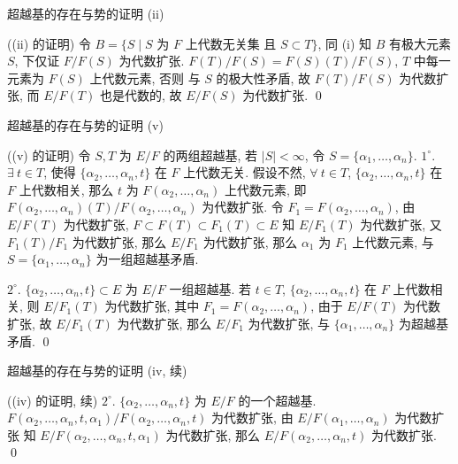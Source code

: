 
\begin{frame}{超越基的存在与势的证明 (ii)}

\startproof[bg=yellow, fg=red]((ii) 的证明)
令 $B = \{ S \mid S \text{ 为 } F \text{ 上代数无关集 且 } S \subset T \}$,
同 (i) 知 $B$ 有极大元素 $S$, 下仅证 $F/F(S)$ 为代数扩张.
$F(T)/F(S) = F(S)(T)/F(S)$, $T$ 中每一元素为 $F(S)$ 上代数元素, 否则
与 $S$ 的极大性矛盾, 故 $F(T)/F(S)$ 为代数扩张, 而 $E/F(T)$ 也是代数的,
故 $E/F(S)$ 为代数扩张.
\qed

\end{frame}


\begin{frame}{超越基的存在与势的证明 (v)}

\startproof[bg=yellow, fg=red]((v) 的证明)
令 $S, T$ 为 $E/F$ 的两组超越基,
若 $|S| < \infty$, 令 $S = \{ \alpha_1, \dots, \alpha_n \}$.
$1^{\circ}$. $\exists\ t \in T$, 使得 $\{ \alpha_2, \dots, \alpha_n, t \}$
在 $F$ 上代数无关.
假设不然, $\forall\ t \in T$, $\{ \alpha_2, \dots, \alpha_n, t \}$ 在 $F$
上代数相关,
那么 $t$ 为 $F(\alpha_2, \dots, \alpha_n)$ 上代数元素,
即 $F(\alpha_2, \dots, \alpha_n)(T)/F(\alpha_2, \dots, \alpha_n)$ 为代数扩张.
令 $F_1 = F(\alpha_2, \dots, \alpha_n)$, 由 $E/F(T)$ 为代数扩张,
$F \subset F(T) \subset F_1(T) \subset E$ 知 $E/F_1(T)$ 为代数扩张,
又 $F_1(T)/F_1$ 为代数扩张, 那么 $E/F_1$ 为代数扩张,
那么 $\alpha_1$ 为 $F_1$ 上代数元素, 与 $S = \{ \alpha_1, \dots, \alpha_n \}$
为一组超越基矛盾.

\pause

$2^{\circ}$. $\{ \alpha_2, \dots, \alpha_n, t \} \subset E$ 为 $E/F$
一组超越基.
若 $t \in T$, $\{ \alpha_2, \dots, \alpha_n, t \}$ 在 $F$ 上代数相关,
则 $E/F_1(T)$ 为代数扩张, 其中 $F_1 = F(\alpha_2, \dots, \alpha_n)$,
由于 $E/F(T)$ 为代数扩张, 故 $E/F_1(T)$ 为代数扩张,
那么 $E/F_1$ 为代数扩张, 与 $\{ \alpha_1, \dots, \alpha_n \}$
为超越基矛盾.
\qed

\end{frame}


\begin{frame}{超越基的存在与势的证明 (iv, 续)}

\startproof[bg=yellow, fg=red]((iv) 的证明, 续)
$2^{\circ}$. $\{ \alpha_2, \dots, \alpha_n, t \}$ 为 $E/F$ 的一个超越基.
$F(\alpha_2, \dots, \alpha_n, t, \alpha_1)/F(\alpha_2, \dots, \alpha_n, t)$
为代数扩张,
由 $E/F(\alpha_1, \dots, \alpha_n)$ 为代数扩张 知
$E/F(\alpha_2, \dots, \alpha_n, t, \alpha_1)$ 为代数扩张,
那么 $E/F(\alpha_2, \dots, \alpha_n, t)$ 为代数扩张.
\qed

\end{frame}

